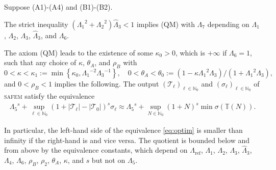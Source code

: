 \documentclass{siamltex1213}
\begin{document}
\begin{theorem}[Quasioptimality]\label{thm:safem}
Suppose (A1)-(A4) and (B1)-(B2).	
\begin{inparaenum}[(a)]
\item
The strict inequality $({\ensuremath{\Lambda_{\mathrm{1}}}}^2+{\ensuremath{\Lambda_{\mathrm{2}}}}^2){\ensuremath{\widehat{\Lambda}_{\mathrm{3}}}} < 1$ implies (QM) 
with ${\ensuremath{\Lambda_{\mathrm{7}}}}$ depending on ${\ensuremath{\Lambda_{\mathrm{1}}}}$, ${\ensuremath{\Lambda_{\mathrm{2}}}}$, ${\ensuremath{\Lambda_{\mathrm{3}}}}$, ${\ensuremath{\widehat{\Lambda}_{\mathrm{3}}}}$, and ${\ensuremath{\Lambda_{\mathrm{6}}}}$. 
\item The axiom (QM) leads to the existence of some $\kappa_0>0$,   which is $+\infty$ if
${\ensuremath{\Lambda_{\mathrm{6}}}}=1$, such that any choice of $\kappa$, $\theta_A$, and $\rho_B$ with 
\[
0<\kappa<\kappa_1:=\min\left\lbrace\kappa_0, {\ensuremath{\Lambda_{\mathrm{1}}}}^{-2}{\ensuremath{\Lambda_{\mathrm{3}}}}^{-1} \right\rbrace,\quad 
0<\theta_A<\theta_0:= (1-\kappa {\ensuremath{\Lambda_{\mathrm{1}}}}^2{\ensuremath{\Lambda_{\mathrm{3}}}})  /(1+{\ensuremath{\Lambda_{\mathrm{1}}}}^2{\ensuremath{\Lambda_{\mathrm{3}}}}),
\] and  $0<\rho_B<1$ implies the following. 
The output  $({\mathcal T_{\ell}})_{\ell \in \mathbb N_0}$ and $(\sigma_\ell)_{\ell \in \mathbb N_0}$ of {\textsc{safem}\xspace}  satisfy the equivalence 
\begin{align}\label{eq:optim}
		{\ensuremath{\Lambda_{\mathrm{5}}}}^s+ \sup_{\ell \in {\mathbb{N}_0}}\left(1+{\left\lvert {{\mathcal T_{\ell}}} \right\rvert} - {\left\lvert {{\mathcal T_{0}}} \right\rvert}\right)^{s}  \sigma_\ell 
		\approx {\ensuremath{\Lambda_{\mathrm{5}}}}^s+\sup_{N\in {\mathbb{N}_0}} (1+N)^s \min \sigma({\mathbb T\left({N}\right)}).
\end{align}
\end{inparaenum}
\end{theorem}

In particular, the left-hand side of the equivalence \cref{eq:optim} is smaller than infinity if the  
right-hand is and vice versa. The quotient 
is bounded below and from above by the equivalence constants, which depend on 
${\ensuremath{\Lambda_{\mathrm{ref}}}}$, ${\ensuremath{\Lambda_{\mathrm{1}}}}$, ${\ensuremath{\Lambda_{\mathrm{2}}}}$, ${\ensuremath{\Lambda_{\mathrm{3}}}}$, ${\ensuremath{\widehat{\Lambda}_{\mathrm{3}}}}$, ${\ensuremath{\Lambda_{\mathrm{4}}}}$, ${\ensuremath{\Lambda_{\mathrm{6}}}}$, $\rho_B$, $\rho_2$,  
$\theta_A$, $\kappa$, and $s$ but not on $\Lambda_5$.
\end{document}
